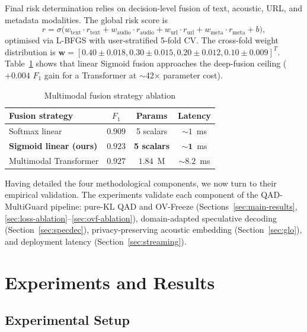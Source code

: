 \documentclass[final,5p,times,number]{elsarticle}
\begin{document}
Final risk determination relies on decision-level fusion of text, acoustic, URL, and metadata modalities. The global risk score is
\begin{equation}
\label{eq:fusion}
r = \sigma\bigl(w_{\mathrm{text}}\cdot r_{\mathrm{text}}
+ w_{\mathrm{audio}}\cdot r_{\mathrm{audio}} + w_{\mathrm{url}}\cdot r_{\mathrm{url}} + w_{\mathrm{meta}}\cdot r_{\mathrm{meta}} + b\bigr),
\end{equation}
optimised via L-BFGS with user-stratified 5-fold CV. The cross-fold weight distribution is $\mathbf{w} = [0.40 \pm 0.018, 0.30 \pm 0.015, 0.20 \pm 0.012, 0.10 \pm 0.009]^T$. Table~\ref{tab:fusion_ablation-en} shows that linear Sigmoid fusion approaches the deep-fusion ceiling ($+0.004$ $F_1$ gain for a Transformer at $\sim$42$\times$ parameter cost).

\begin{table}[!t]
\centering
\caption{Multimodal fusion strategy ablation}
\label{tab:fusion_ablation-en}
\small
\renewcommand{\arraystretch}{1.15}
\begin{tabular}{lccc}
\toprule
\textbf{Fusion strategy} & \textbf{$F_1$} & \textbf{Params} & \textbf{Latency} \\
\midrule
Softmax linear & $0.909$ & 5 scalars & $\sim 1$~ms \\
\textbf{Sigmoid linear (ours)} & $\mathbf{0.923}$ & \textbf{5 scalars} & $\mathbf{\sim 1}$~ms \\
Multimodal Transformer & $0.927$ & $1.84$~M & $\sim 8.2$~ms \\
\bottomrule
\end{tabular}
\end{table}

Having detailed the four methodological components, we now turn to their empirical validation. The experiments validate each component of the QAD-MultiGuard pipeline: pure-KL QAD and OV-Freeze (Sections~\ref{sec:main-results}, \ref{sec:loss-ablation}--\ref{sec:ovf-ablation}), domain-adapted speculative decoding (Section~\ref{sec:specdec}), privacy-preserving acoustic embedding (Section~\ref{sec:glo}), and deployment latency (Section~\ref{sec:streaming}).

\section{Experiments and Results}\label{sec:experiments}
\subsection{Experimental Setup}
\end{document}
